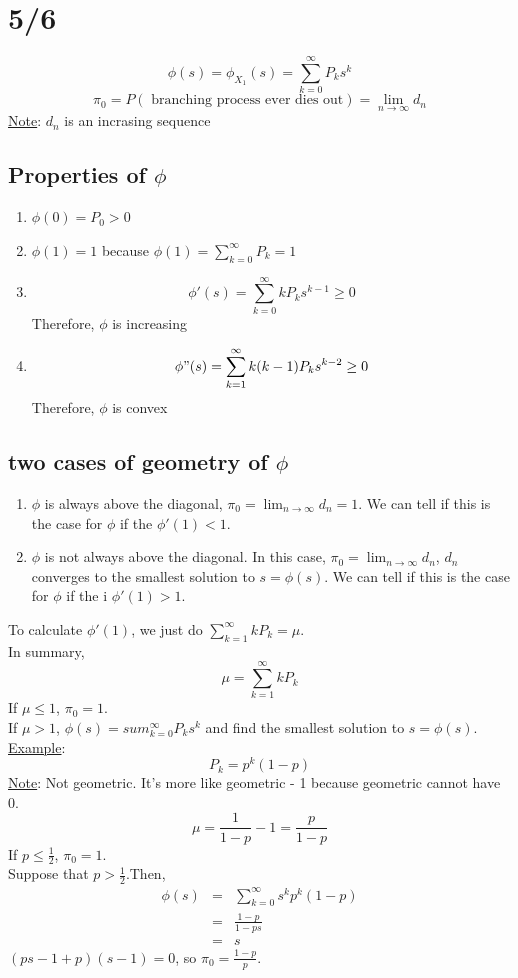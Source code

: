 \section*{5/6}
  $$
    \phi(s)= \phi_{X_1}(s) = \sum_{k = 0}^{\infty} P_k s^k
  $$
  $$
    \pi_0  = P(\text{ branching process ever dies out}) = \lim_{n \to \infty}d_n
  $$
  \underline{Note}: $d_n$ is an incrasing sequence
  \subsection*{Properties of $\phi$}
    \begin{enumerate}
      \item $\phi(0) = P_0 > 0$
      \item $\phi(1) = 1$ because $\phi(1) = \sum_{k = 0}^{\infty}P_k = 1$
      \item 
      $$
        \phi'(s) = \sum_{k = 0}^{\infty}kP_k s^{k - 1} \ge 0
      $$
      Therefore, $\phi$ is increasing
      \item
      $$
        \phi"(s) = \sum_{k = 1}^{\infty}k(k-1)P_k s^{k-2} \ge 0
      $$
      Therefore, $\phi$ is convex
    \end{enumerate}
  \subsection*{two cases of geometry of $\phi$}
    \begin{enumerate}
      \item $\phi$ is always above the diagonal, $\pi_0 = \lim_{n \to \infty}
        d_n = 1$. We can tell if this is the case for $\phi$ if the 
        $\phi'(1) < 1$.
      \item $\phi$ is not always above the diagonal. In this case, $\pi_0 = 
        \lim_{n \to \infty} d_n$, $d_n$ converges to the smallest solution to 
        $s = \phi(s)$. We can tell if this is the case for $\phi$ if the i
        $\phi'(1) > 1$.
    \end{enumerate}
    To calculate $\phi'(1)$, we just do $\sum_{k = 1}^{\infty} kP_k = \mu$.\\
    In summary,
    $$
      \mu = \sum_{k = 1}^{\infty} k P_k
    $$
    If $\mu \le 1$, $\pi_0 = 1$.\\
    If $\mu > 1$, $\phi(s) = sum_{k = 0}^{\infty}P_k s^k$ and find the
      smallest solution to $s = \phi(s)$.\\

    \noindent\underline{Example}: 
    $$
      P_k = p^k(1 - p)
    $$
    \underline{Note}: Not geometric. It's more like geometric - 1 because
      geometric cannot have 0.\\
    $$
      \mu = \frac{1}{1-p} - 1 = \frac{p}{1 - p}
    $$
    If $p \le \frac{1}{2}$, $\pi_0 = 1$.\\
    Suppose that $p > \frac{1}{2}$.Then,
    \begin{eqnarray*}
      \phi(s) & = & \sum_{k = 0}^{\infty}s^k p^k(1 - p)\\
        & = & \frac{1 - p}{1 - ps}\\
        & = & s
    \end{eqnarray*}
    $(ps - 1 + p)(s - 1) = 0$, so $\pi_0 = \frac{1 - p}{p}$.\\

